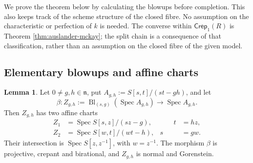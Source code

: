 \documentclass[a4paper,reqno]{amsart}
\def\n{\mathfrak{n}}
\DeclareMathOperator{\Spec}{Spec}
\theoremstyle{definition}
\newtheorem{Lem}[Thm]{Lemma}
\begin{document}
We prove the theorem below by calculating the blowups before completion. This also keeps track of the scheme structure of the closed fibre. No assumption on the characteristic or perfection of $k$ is needed. The converse within $\mathsf{Crep}_1(R)$ is Theorem \ref{thm:auslander-mckay}; the split chain is a consequence of that classification, rather than an assumption on the closed fibre of the given model.

\subsection{Elementary blowups and affine charts}

\begin{Lem}\label{lem:elementary-flag-blowup}
Let $0\ne g,h\in\n$, put $A_{g,h}:=S[s,t]/(st-gh)$, and let
\[
\beta\colon Z_{g,h}:=\operatorname{Bl}_{(s,g)}(\Spec A_{g,h})
\longrightarrow\Spec A_{g,h}.
\]
Then $Z_{g,h}$ has two affine charts
\begin{equation}\label{eq:elementary-blowup-charts}
\begin{aligned}
Z_1&=\Spec S[s,z]/(sz-g),&\qquad t&=hz,\\
Z_2&=\Spec S[w,t]/(wt-h),& s&=gw.
\end{aligned}
\end{equation}
Their intersection is $\Spec S[z,z^{-1}]$, with $w=z^{-1}$. The morphism $\beta$ is projective, crepant and birational, and $Z_{g,h}$ is normal and Gorenstein.
\end{Lem}
\end{document}
